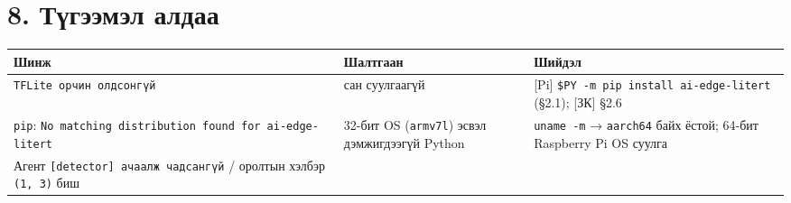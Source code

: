\hypertarget{ux442ux4afux433ux44dux44dux43cux44dux43b-ux430ux43bux434ux430ux430}{%
\section{8. Түгээмэл алдаа}\label{ux442ux4afux433ux44dux44dux43cux44dux43b-ux430ux43bux434ux430ux430}}

\begingroup\scriptsize\begin{longtable}[]{@{}lll@{}}
\toprule
\begin{minipage}[b]{0.30\columnwidth}\raggedright
Шинж\strut
\end{minipage} & \begin{minipage}[b]{0.30\columnwidth}\raggedright
Шалтгаан\strut
\end{minipage} & \begin{minipage}[b]{0.30\columnwidth}\raggedright
Шийдэл\strut
\end{minipage}\tabularnewline
\midrule
\endhead
\begin{minipage}[t]{0.30\columnwidth}\raggedright
\texttt{TFLite\ орчин\ олдсонгүй}\strut
\end{minipage} & \begin{minipage}[t]{0.30\columnwidth}\raggedright
сан суулгаагүй\strut
\end{minipage} & \begin{minipage}[t]{0.30\columnwidth}\raggedright
{[}Pi{]} \texttt{\$PY\ -m\ pip\ install\ ai-edge-litert} (§2.1); {[}ЗК{]} §2.6\strut
\end{minipage}\tabularnewline
\begin{minipage}[t]{0.30\columnwidth}\raggedright
\texttt{pip}: \texttt{No\ matching\ distribution\ found\ for\ ai-edge-litert}\strut
\end{minipage} & \begin{minipage}[t]{0.30\columnwidth}\raggedright
32-бит OS (\texttt{armv7l}) эсвэл дэмжигдээгүй Python\strut
\end{minipage} & \begin{minipage}[t]{0.30\columnwidth}\raggedright
\texttt{uname\ -m} → \texttt{aarch64} байх ёстой; 64-бит Raspberry Pi OS суулга\strut
\end{minipage}\tabularnewline
\begin{minipage}[t]{0.30\columnwidth}\raggedright
Агент \texttt{{[}detector{]}\ ачаалж\ чадсангүй} / оролтын хэлбэр \texttt{(1,\ 3)} биш\strut
\end{minipage} & \begin{minipage}[t]{0.30\columnwidth}\raggedright

\end{minipage}
\end{longtable}
